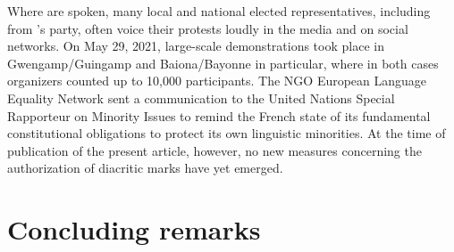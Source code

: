 \documentclass[output=paper,colorlinks,citecolor=brown]{langscibook}
\begin{document}
Where  are spoken, many local and national elected representatives, including from ’s party, often voice their protests loudly in the media and on social networks. On May 29, 2021, large-scale demonstrations took place in Gwengamp/Guingamp and Baiona/Bayonne in particular, where in both cases organizers counted up to 10,000 participants. The NGO European Language Equality Network sent a communication to the United Nations Special Rapporteur on Minority Issues to remind the French state of its fundamental constitutional obligations to protect its own linguistic minorities. At the time of publication of the present article, however, no new measures concerning the authorization of diacritic marks have yet emerged. 

\section{Concluding remarks}
\end{document}
